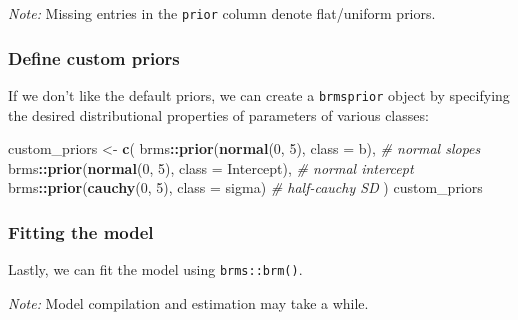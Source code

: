 \documentclass[
  11pt,
]{article}
\newenvironment{Shaded}{\begin{snugshade}}{\end{snugshade}}
\newcommand{\AttributeTok}[1]{\textcolor[rgb]{0.13,0.29,0.53}{#1}}
\newcommand{\CommentTok}[1]{\textcolor[rgb]{0.56,0.35,0.01}{\textit{#1}}}
\newcommand{\DecValTok}[1]{\textcolor[rgb]{0.00,0.00,0.81}{#1}}
\newcommand{\FunctionTok}[1]{\textcolor[rgb]{0.13,0.29,0.53}{\textbf{#1}}}
\newcommand{\NormalTok}[1]{#1}
\newcommand{\OtherTok}[1]{\textcolor[rgb]{0.56,0.35,0.01}{#1}}
\newcommand{\SpecialCharTok}[1]{\textcolor[rgb]{0.81,0.36,0.00}{\textbf{#1}}}
\begin{document}
\emph{Note:} Missing entries in the \texttt{prior} column denote flat/uniform priors.

\hypertarget{define-custom-priors}{%
\subsubsection{Define custom priors}\label{define-custom-priors}}

If we don't like the default priors, we can create a \texttt{brmsprior} object
by specifying the desired distributional properties of parameters of
various classes:

\begin{Shaded}
\begin{Highlighting}[]
\NormalTok{custom\_priors }\OtherTok{\textless{}{-}} \FunctionTok{c}\NormalTok{(}
\NormalTok{  brms}\SpecialCharTok{::}\FunctionTok{prior}\NormalTok{(}\FunctionTok{normal}\NormalTok{(}\DecValTok{0}\NormalTok{, }\DecValTok{5}\NormalTok{), }\AttributeTok{class =}\NormalTok{ b),          }\CommentTok{\# normal slopes}
\NormalTok{  brms}\SpecialCharTok{::}\FunctionTok{prior}\NormalTok{(}\FunctionTok{normal}\NormalTok{(}\DecValTok{0}\NormalTok{, }\DecValTok{5}\NormalTok{), }\AttributeTok{class =}\NormalTok{ Intercept),  }\CommentTok{\# normal intercept}
\NormalTok{  brms}\SpecialCharTok{::}\FunctionTok{prior}\NormalTok{(}\FunctionTok{cauchy}\NormalTok{(}\DecValTok{0}\NormalTok{, }\DecValTok{5}\NormalTok{), }\AttributeTok{class =}\NormalTok{ sigma)       }\CommentTok{\# half{-}cauchy SD}
\NormalTok{)}
\NormalTok{custom\_priors}
\end{Highlighting}
\end{Shaded}

\hypertarget{fitting-the-model}{%
\subsubsection{Fitting the model}\label{fitting-the-model}}

Lastly, we can fit the model using \texttt{brms::brm()}.

\emph{Note:} Model compilation and estimation may take a while.
\end{document}
